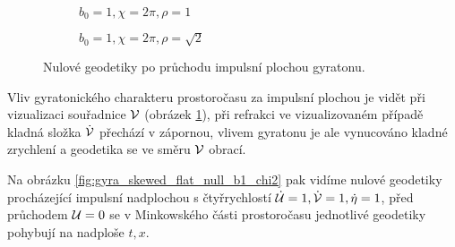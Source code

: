 \begin{figure}[H]
    \centering
    \begin{subfigure}[b]{0.48\textwidth}
        \caption{$b_0=1, \chi=2\pi, \rho=1$}
    \end{subfigure}
    \begin{subfigure}[b]{0.48\textwidth}
        \caption{$b_0=1, \chi=2\pi, \rho=\sqrt{2}$} 
    \end{subfigure}
    \caption{Nulové geodetiky po průchodu impulsní plochou gyratonu.}
    \label{fig:gyra_flat_null_b1_chi1_2_vxy}
\end{figure}

Vliv gyratonického charakteru prostoročasu za impulsní plochou je vidět při vizualizaci souřadnice $\mathcal{V}$ (obrázek \ref{fig:gyra_flat_null_b1_chi1_2_vxy}),
při refrakci ve vizualizovaném případě kladná složka $\dot{\mathcal{V}}$ přechází v zápornou, vlivem gyratonu je ale vynucováno kladné zrychlení a
geodetika se ve směru $\mathcal{V}$ obrací.

Na obrázku \ref{fig:gyra_skewed_flat_null_b1_chi2} pak vidíme nulové geodetiky procházející impulsní nadplochou
s čtyřrychlostí $\dot{\mathcal{U}} = 1, \dot{\mathcal{V}} = 1, \dot{\eta} = 1$, před průchodem $\mathcal{U}=0$ se v Minkowského části
prostoročasu jednotlivé geodetiky pohybují na nadploše $t, x$.

